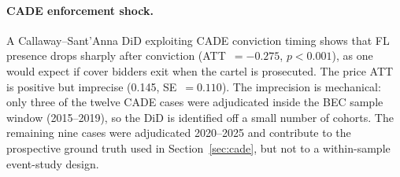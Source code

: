 \paragraph{CADE enforcement shock.}
A Callaway--Sant'Anna DiD exploiting CADE conviction timing shows that
FL presence drops sharply after conviction (ATT~$= -0.275$,
$p < 0.001$), as one would expect if cover bidders exit when the
cartel is prosecuted. The price ATT is positive but imprecise (0.145,
SE~$= 0.110$). The imprecision is mechanical: only three of the
twelve CADE cases were adjudicated inside the BEC sample window
(2015--2019), so the DiD is identified off a small number of cohorts.
The remaining nine cases were adjudicated 2020--2025 and contribute
to the prospective ground truth used in
Section~\ref{sec:cade}, but not to a within-sample event-study
design.
